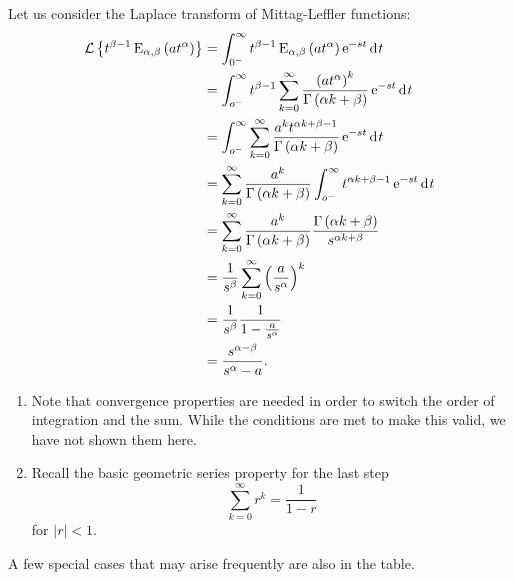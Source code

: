     Let us consider the Laplace transform of Mittag-Leffler functions:
    \begin{align*}
      \mathcal L \left\{ t^{\beta-1} \operatorname{E}_{\alpha,\beta}\left( a t^\alpha \right) \right\} &= \int_{0^-}^\infty t^{\beta-1} \operatorname{E}_{\alpha,\beta}\left( a t^\alpha \right) \operatorname{e}^{-s t} \operatorname{d}\hspace*{-1pt} t \\
      &= \int_{o^-}^\infty t^{\beta - 1} \sum_{k=0}^\infty \frac{\left( a t^\alpha \right)^k}{\Gamma \left( \alpha k + \beta \right)} \operatorname{e}^{-s t} \operatorname{d}\hspace*{-1pt} t \\
      &= \int_{o^-}^\infty \sum_{k=0}^\infty \frac{ a^k t^{\alpha k + \beta - 1} }{\Gamma \left( \alpha k + \beta \right)} \operatorname{e}^{-s t} \operatorname{d}\hspace*{-1pt} t \\
	&= \sum_{k=0}^\infty \frac{ a^k }{\Gamma \left( \alpha k + \beta \right)} \int_{o^-}^\infty t^{\alpha k + \beta - 1} \operatorname{e}^{-s t} \operatorname{d}\hspace*{-1pt} t \\
	&= \sum_{k=0}^\infty \frac{a^k}{\Gamma \left( \alpha k + \beta \right)} \frac{\Gamma \left( \alpha k + \beta \right) }{s^{\alpha k + \beta}} \\
	&= \frac{1}{s^\beta} \sum_{k=0}^\infty \left( \frac{a}{s^\alpha} \right)^k \\
	&= \frac{1}{s^\beta} \frac{1}{1 - \frac{a}{s^\alpha}} \\
	&= \frac{s^{\alpha - \beta}}{s^\alpha - a}.
    \end{align*}

    \begin{remark} 
      \hspace*{1em}
      \begin{enumerate}
	\item Note that convergence properties are needed in order to switch the order of integration and the sum. While the conditions are met to make this valid, we have not shown them here.
	\item Recall the basic geometric series property for the last step
	  \begin{equation*}
	    \sum_{k=0}^\infty r^k = \frac{1}{1 - r}
	  \end{equation*}
	  for $\left| r \right| < 1$.
      \end{enumerate}
    \end{remark}
    A few special cases that may arise frequently are also in the table.
